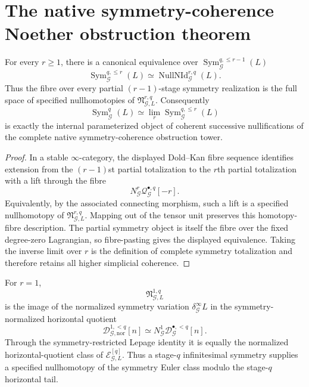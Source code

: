 \section{The native symmetry-coherence Noether obstruction theorem}
\label{sec:symmetry-noether-the-native-symmetry-coherence-noether-obstruction-theorem}

\begin{theorem}
\label{thm:symmetry-noether-stagewise-native-symmetry-coherence-lifting-theorem}
For every $r\ge1$, there is a canonical equivalence over
$\operatorname{Sym}_{\mathcal G}^{q,\le r-1}(L)$
\[
\boxed{
\operatorname{Sym}_{\mathcal G}^{q,\le r}(L)
\simeq
\operatorname{NullNId}_{\mathcal G}^{r,q}(L).
}
\]
Thus the fibre over every partial $(r-1)$-stage symmetry realization is the full
space of specified nullhomotopies of
$\mathfrak N_{\mathcal G,L}^{r,q}$.
Consequently
\[
\boxed{
\operatorname{Sym}_{\mathcal G}^{q}(L)
\simeq
\lim_r
\operatorname{Sym}_{\mathcal G}^{q,\le r}(L)
}
\]
is exactly the internal parameterized object of coherent successive nullifications
of the complete native symmetry-coherence obstruction tower.
\end{theorem}

\begin{proof}
In a stable $\infty$-category, the displayed Dold--Kan fibre sequence identifies
extension from the $(r-1)$st partial totalization to the $r$th partial
totalization with a lift through the fibre
\[
N_{\mathcal G}^r
\mathcal Q_{\mathcal G}^{\bullet,q}[-r].
\]
Equivalently, by the associated connecting morphism, such a lift is a specified
nullhomotopy of
$\mathfrak N_{\mathcal G,L}^{r,q}$.
Mapping out of the tensor unit preserves this homotopy-fibre description.
The partial symmetry object is itself the fibre over the fixed degree-zero
Lagrangian, so fibre-pasting gives the displayed equivalence.  Taking the inverse
limit over $r$ is the definition of complete symmetry totalization and therefore
retains all higher simplicial coherence.
\end{proof}

\begin{corollary}
\label{cor:symmetry-noether-first-noether-identity-as-the-first-obstruction}
For $r=1$,
\[
\mathfrak N_{\mathcal G,L}^{1,q}
\]
is the image of the normalized symmetry variation
$\delta_{\mathcal G}^{\infty}L$ in the symmetry-normalized horizontal quotient
\[
\mathcal D_{\mathcal G,\mathrm{nor}}^{1,<q}[n]
\simeq
N_{\mathcal G}^1\mathcal D_{\mathcal G}^{\bullet,<q}[n].
\]
Through the symmetry-restricted Lepage identity it is equally the normalized
horizontal-quotient class of $\mathscr E_{\mathcal G,L}^{[q]}$.
Thus a stage-$q$ infinitesimal symmetry supplies a specified nullhomotopy of
the symmetry Euler class modulo the stage-$q$ horizontal tail.
\end{corollary}

